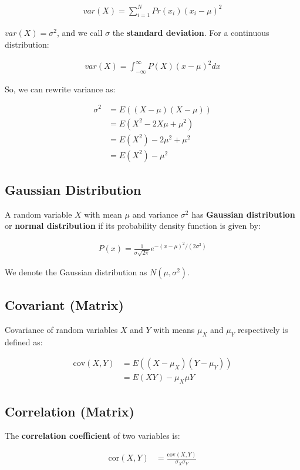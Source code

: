 \documentclass[11pt]{article}
\begin{document}
\begin{align*}
    var\left( X \right) = \sum_{i=1}^{N} Pr\left( x_{i} \right)\left( x_{i} - \mu \right)^{2}
\end{align*}

\(var\left( X \right) = \sigma^{2}\), and we call \(\sigma\) the \textbf{standard deviation}. For a continuous distribution:

\begin{align*}
    var\left( X \right) = \int_{-\infty}^{\infty} P\left( X \right)\left( x - \mu \right)^{2}dx
\end{align*}

So, we can rewrite variance as:

\begin{align*}
    \sigma^{2} &= E\left(\left( X - \mu \right)\left( X - \mu \right)\right) \\
    &= E\left( X^{2} - 2X\mu + \mu^{2} \right) \\
    &= E\left( X^{2} \right) - 2\mu^{2} + \mu^{2} \\
    &= E\left( X^{2} \right) - \mu^{2}
\end{align*}

\subsection{Gaussian Distribution}
\label{sec:org9c85fcb}
A random variable \(X\) with mean \(\mu\) and variance \(\sigma^{2}\) has \textbf{Gaussian distribution} or \textbf{normal distribution} if its probability density function is given by:

\begin{align*}
    P\left( x \right) = \frac{1}{\sigma\sqrt{2\pi}}e^{-\left( x - \mu \right)^{2}/\left(2\sigma^{2}\right)}
\end{align*}

We denote the Gaussian distribution as \(N\left( \mu,\sigma^{2} \right)\).

\subsection{Covariant (Matrix)}
\label{sec:org6db2ddc}
Covariance of random variables \(X\) and \(Y\) with means \(\mu_{X}\) and \(\mu_{Y}\) respectively is defined as:

\begin{align*}
    \text{cov}\left(X,Y\right) &= E\left(\left(X-\mu_{X}\right)\left(Y-\mu_{Y}\right)\right) \\
    &= E\left(XY\right) - \mu_{X}\mu{Y}
\end{align*}

\subsection{Correlation (Matrix)}
\label{sec:org741cb98}
The \textbf{correlation coefficient} of two variables is:

\begin{align*}
    \text{cor}\left(X,Y\right) &= \frac{\text{cov}\left(X,Y\right)}{\sigma_{X}\sigma_{Y}}
\end{align*}
\end{document}
